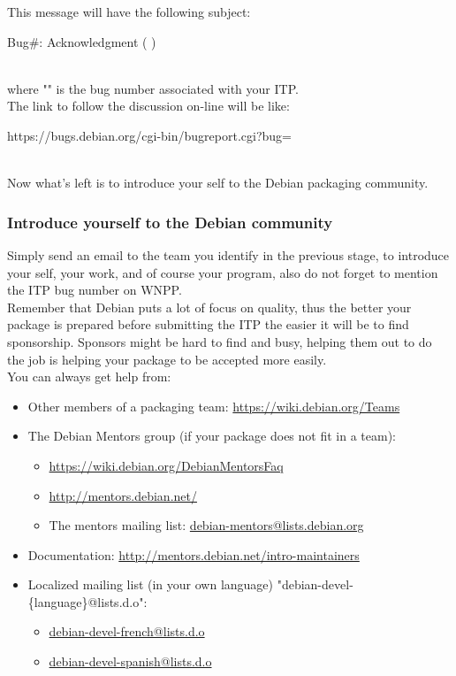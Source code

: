This message will have the following subject: 
\begin{script}
Bug#: Acknowledgment (  \magenta{--} )
\end{script}
\\[-0.75cm]
\noindent where "" is the bug number associated with your ITP. \\
The link to follow the discussion on-line will be like:
\begin{script}
https://bugs.debian.org/cgi-bin/bugreport.cgi?bug=
\end{script}
\\[-0.75cm]
Now what's left is to introduce your self to the Debian packaging community. 

\subsubsection{Introduce yourself to the Debian community}

Simply send an email to the team you identify in the previous stage, to introduce your self, your work, and of course your program, also do not forget to mention the ITP bug number on WNPP. \\
Remember that Debian puts a lot of focus on quality, thus the better your package is prepared before submitting the ITP the easier it will be to find sponsorship. Sponsors might be hard to find and busy, helping them out to do the job is helping your package to be accepted more easily. \\
You can always get help from:
\begin{itemize}
\item Other members of a packaging team: \href{https://wiki.debian.org/Teams}{https://wiki.debian.org/Teams}
\item The Debian Mentors group (if your package does not fit in a team):
\begin{itemize}
\item \href{https://wiki.debian.org/DebianMentorsFaq}{https://wiki.debian.org/DebianMentorsFaq}
\item \href{http://mentors.debian.net/}{http://mentors.debian.net/}
\item The mentors mailing list: \href{mailto:debian-mentors@lists.debian.org}{debian-mentors@lists.debian.org}
\end{itemize}
\item Documentation: \href{http://mentors.debian.net/intro-maintainers}{http://mentors.debian.net/intro-maintainers}
\item Localized mailing list (in your own language) "debian-devel-\{language\}@lists.d.o":
\begin{itemize}
\item \href{mailto:debian-devel-french@lists.d.o}{debian-devel-french@lists.d.o}
\item \href{mailto:debian-devel-spanish@lists.d.o}{debian-devel-spanish@lists.d.o}
\end{itemize}
\end{itemize}

